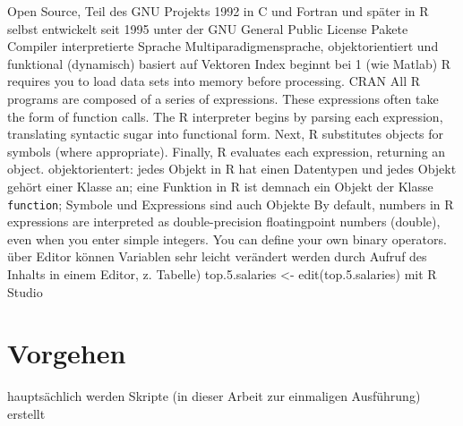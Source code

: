 Open Source, Teil des GNU Projekts
1992 in C und Fortran und später in R selbst entwickelt
seit 1995 unter der GNU General Public License
Pakete
Compiler
interpretierte Sprache
Multiparadigmensprache, objektorientiert und funktional
(dynamisch)
basiert auf Vektoren
Index beginnt bei 1 (wie Matlab)
R requires you to load data sets into memory before processing.
CRAN
All R programs are composed of a series of expressions. These expressions often take
the form of function calls. The R interpreter begins by parsing each expression,
translating syntactic sugar into functional form. Next, R substitutes objects for symbols
(where appropriate). Finally, R evaluates each expression, returning an object.
objektorientert: jedes Objekt in R hat einen Datentypen und jedes Objekt gehört einer Klasse an; eine Funktion in R ist demnach ein Objekt der Klasse \texttt{function}; Symbole und Expressions sind auch Objekte
By default, numbers in R expressions are interpreted as double-precision floatingpoint
numbers (double), even when you enter simple integers.
You can define your own binary operators.
über Editor können Variablen sehr leicht verändert werden durch Aufruf des Inhalts in einem Editor, z. Tabelle) top.5.salaries <- edit(top.5.salaries)
mit R Studio


\parencite{adler_r_2012}

\section{Vorgehen}

hauptsächlich werden Skripte (in dieser Arbeit zur einmaligen Ausführung) erstellt
